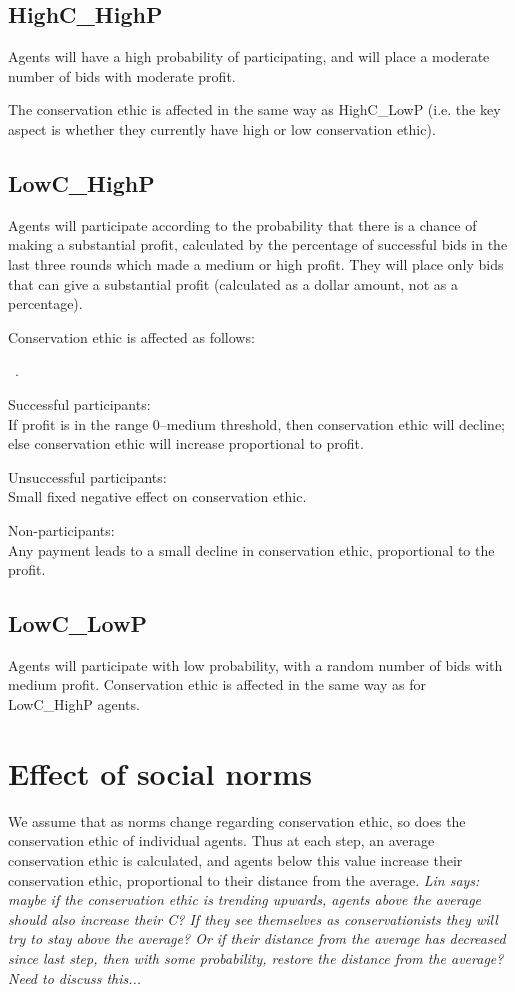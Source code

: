 \documentclass{article} %
\newcounter{bean}
\newenvironment{tightenumerate}{
                \begin{list}{
                  {\mbox {
                      \arabic{bean}.\/}}}{\usecounter{bean}
                      \setlength{\itemsep}{-1pt}\setlength{\topsep}{0pt}}}{
                \end{list}}
\begin{document}
\subsection{HighC\_HighP}
Agents will have a high probability of participating, and will place a
moderate number of bids with moderate profit.

The conservation ethic is affected  in the same way as HighC\_LowP
(i.e. the key aspect is whether they currently have high or low
conservation ethic).

\subsection{LowC\_HighP}
Agents will participate according to the probability that there is a
chance of making a substantial profit, calculated by the percentage of
successful bids in the last three rounds which made a medium or high
profit. They will place only bids that can give a substantial profit
(calculated as a dollar amount, not as a percentage).

Conservation ethic is affected as follows:
\begin{tightenumerate}
\item Successful participants:\\
If profit is in the range 0--medium threshold, then conservation ethic
will decline; else conservation ethic will increase proportional to
profit. 
\item Unsuccessful participants:\\
Small fixed negative effect on conservation ethic.
\item Non-participants:\\
Any payment leads to a small decline in conservation ethic,
proportional to the profit.
\end{tightenumerate}

\subsection{LowC\_LowP}
Agents will participate with low probability, with a random number of
bids with medium profit.  Conservation ethic is affected in the same
way as for LowC\_HighP agents.

\section{Effect of social norms}
We assume that as norms change regarding conservation ethic, so does
the conservation ethic of individual agents. Thus at each step, an
average conservation ethic is calculated, and agents below this value
increase their conservation ethic, proportional to their distance from
the average.
{\it Lin says: maybe if the conservation ethic is trending upwards,
  agents above the average should also increase their C? If they see
  themselves as conservationists they will try to stay above the
  average? Or if their distance from the average has decreased since
  last step, then with some probability, restore the distance from the
  average? Need to discuss this...}
\end{document}
